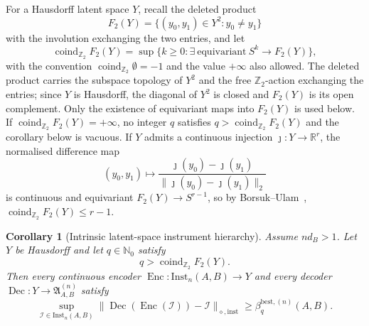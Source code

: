 \documentclass[11pt,a4paper]{article}
\newtheorem{corollary}[theorem]{Corollary}
\newcommand{\Inst}{\mathrm{Inst}}
\newcommand{\coind}{\operatorname{coind}_{\mathbb Z_2}}
\begin{document}
For a Hausdorff latent space $Y$, recall the deleted product
\[
F_2(Y)=\{(y_0,y_1)\in Y^2:y_0\neq y_1\}
\]
with the involution exchanging the two entries, and let
\[
\coind F_2(Y)
=\sup\big\{k\ge0:\exists\ \text{equivariant}\ S^k\to F_2(Y)\big\},
\]
with the convention $\coind\emptyset=-1$ and the value $+\infty$ also allowed. The deleted product carries the subspace topology of $Y^2$ and the free $\mathbb Z_2$-action exchanging the entries; since $Y$ is Hausdorff, the diagonal of $Y^2$ is closed and $F_2(Y)$ is its open complement. Only the existence of equivariant maps into $F_2(Y)$ is used below. If $\coind F_2(Y)=+\infty$, no integer $q$ satisfies $q>\coind F_2(Y)$ and the corollary below is vacuous. If $Y$ admits a continuous injection $\jmath:Y\to\mathbb R^r$, the normalised difference map
\[
(y_0,y_1)\longmapsto\frac{\jmath(y_0)-\jmath(y_1)}{\|\jmath(y_0)-\jmath(y_1)\|_2}
\]
is continuous and equivariant $F_2(Y)\to S^{r-1}$, so by Borsuk--Ulam~\cite{Matousek2003}, $\coind F_2(Y)\le r-1$.

\begin{corollary}[Intrinsic latent-space instrument hierarchy]
\label{cor:intrinsic}
Assume $nd_B>1$. Let $Y$ be Hausdorff and let $q\in\mathbb N_0$ satisfy
\[
q>\coind F_2(Y).
\]
Then every continuous encoder $\operatorname{Enc}:\Inst_n(A,B)\to Y$ and every decoder $\operatorname{Dec}:Y\to\mathfrak A_{A,B}^{(n)}$ satisfy
\[
\sup_{\mathcal I\in\Inst_n(A,B)}
\|\operatorname{Dec}(\operatorname{Enc}(\mathcal I))-\mathcal I\|_{\diamond,\mathrm{inst}}
\ge\beta_q^{\mathrm{best},(n)}(A,B).
\]
\end{corollary}
\end{document}
